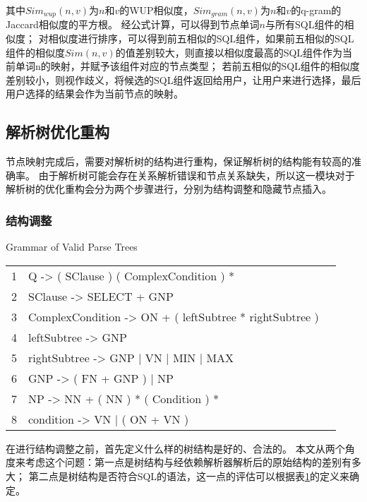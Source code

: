 其中$Sim_{wup}(n,v)$为$n$和$v$的WUP相似度\cite{wu1994verb}，$Sim_{gram}(n,v)$为$n$和$v$的q-gram的Jaccard相似度的平方根\cite{xiao2011efficient}。
经公式计算，可以得到节点单词$n$与所有SQL组件的相似度；
对相似度进行排序，可以得到前五相似的SQL组件，如果前五相似的SQL组件的相似度$Sim(n,v)$的值差别较大，则直接以相似度最高的SQL组件作为当前单词n的映射，并赋予该组件对应的节点类型；
若前五相似的SQL组件的相似度差别较小，则视作歧义，将候选的SQL组件返回给用户，让用户来进行选择，最后用户选择的结果会作为当前节点的映射。 


\subsection{解析树优化重构}
\label{nli:jxsyhcg}

节点映射完成后，需要对解析树的结构进行重构，保证解析树的结构能有较高的准确率。
由于解析树可能会存在关系解析错误和节点关系缺失，所以这一模块对于解析树的优化重构会分为两个步骤进行，分别为结构调整和隐藏节点插入。

\subsubsection{结构调整}

\begin{table}[!hpb]
  \centering
    {Grammar of Valid Parse Trees}
  \label{nli:hfjxsjggz}
  \begin{tabular}{@{}llr@{}} \toprule
    1  & 	Q -> ( SClause ) ( ComplexCondition ) *\\
    2  & 	SClause -> SELECT + GNP\\
    3  & 	ComplexCondition -> ON + ( leftSubtree * rightSubtree )\\
    4  & 	leftSubtree -> GNP\\
    5  & 	rightSubtree -> GNP | VN | MIN | MAX\\
    6  & 	GNP -> ( FN + GNP ) | NP\\
    7  & 	NP -> NN + ( NN ) * ( Condition ) *\\
    8  & 	condition -> VN | ( ON + VN )\\\bottomrule
  \end{tabular}
\end{table}

在进行结构调整之前，首先定义什么样的树结构是好的、合法的。
本文从两个角度来考虑这个问题：第一点是树结构与经依赖解析器解析后的原始结构的差别有多大；
第二点是树结构是否符合SQL的语法，这一点的评估可以根据表\ref{nli:hfjxsjggz}的定义来确定\cite{li2014constructing}。

